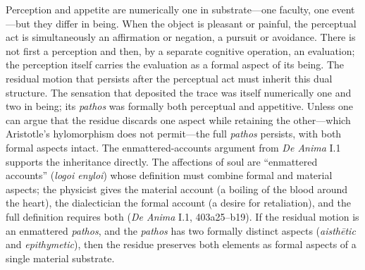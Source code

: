 Perception and appetite are numerically one in substrate---one faculty, one event---but they differ in being. When the object is pleasant or painful, the perceptual act is simultaneously an affirmation or negation, a pursuit or avoidance. There is not first a perception and then, by a separate cognitive operation, an evaluation; the perception itself carries the evaluation as a formal aspect of its being. The residual motion that persists after the perceptual act must inherit this dual structure. The sensation that deposited the trace was itself numerically one and two in being; its \textit{pathos} was formally both perceptual and appetitive. Unless one can argue that the residue discards one aspect while retaining the other---which Aristotle's hylomorphism does not permit---the full \textit{pathos} persists, with both formal aspects intact. The enmattered-accounts argument from \textit{De Anima} I.1 supports the inheritance directly. The affections of soul are ``enmattered accounts'' (\textit{logoi enyloi}) whose definition must combine formal and material aspects; the physicist gives the material account (a boiling of the blood around the heart), the dialectician the formal account (a desire for retaliation), and the full definition requires both (\textit{De Anima} I.1, 403a25--b19). If the residual motion is an enmattered \textit{pathos}, and the \textit{pathos} has two formally distinct aspects (\textit{aisthētic} and \textit{epithymetic}), then the residue preserves both elements as formal aspects of a single material substrate.

